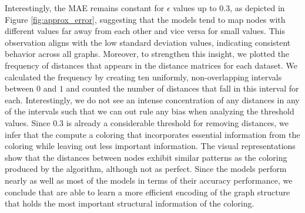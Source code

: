 Interestingly, the MAE remains constant for $\epsilon$ values up to $0.3$, as depicted in Figure \ref{fig:approx_error}, suggesting that the \gnn models tend to map nodes with different values far away from each other and vice versa for small values. This observation aligns with the low standard deviation values, indicating consistent behavior across all graphs. Moreover, to strengthen this insight, we plotted the frequency of distances that appears in the \gnn distance matrices for each dataset. We calculated the frequency by creating ten uniformly, non-overlapping intervals between $0$ and $1$ and counted the number of distances that fall in this interval for each. Interestingly, we do not see an intense concentration of any distances in any of the intervals such that we can out rule any bias when analyzing the threshold values. Since $0.3$ is already a considerable threshold for removing distances, we infer that the \gnns compute a coloring that incorporates essential information from the \wl coloring while leaving out less important information. The visual representations show that the distances between nodes exhibit similar patterns as the coloring produced by the \wl algorithm, although not as perfect. Since the \gnn models perform nearly as well as most of the \wlnn models in terms of their accuracy performance, we conclude that \gnns are able to learn a more efficient encoding of the graph structure that holds the most important structural information of the \wl coloring.

